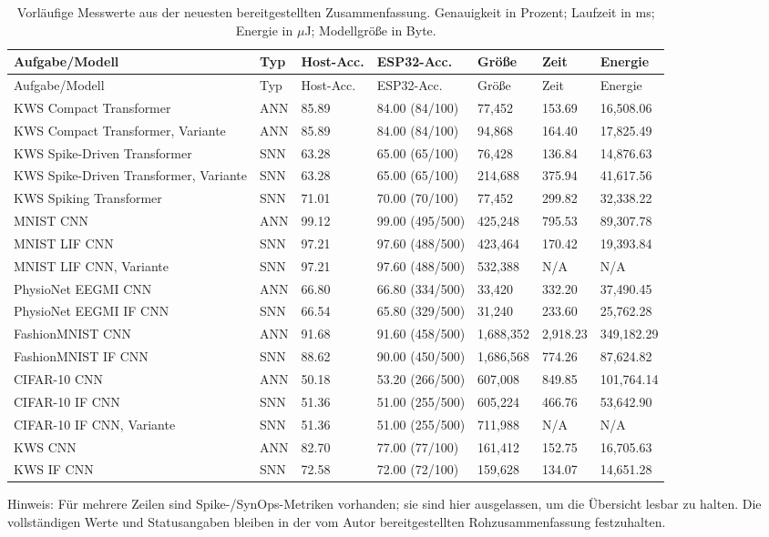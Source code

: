 \documentclass[11pt,a4paper]{article}
\begin{document}
\begin{longtable}{p{2.1cm}p{1.35cm}p{1.35cm}p{1.45cm}p{1.35cm}p{1.1cm}p{1.15cm}}
\caption{Vorläufige Messwerte aus der neuesten bereitgestellten Zusammenfassung. Genauigkeit in Prozent; Laufzeit in ms; Energie in $\mu$J; Modellgröße in Byte.}\label{tab:results}\\
\toprule
Aufgabe/Modell & Typ & Host-Acc. & ESP32-Acc. & Größe & Zeit & Energie\\
\midrule
\endfirsthead
\toprule
Aufgabe/Modell & Typ & Host-Acc. & ESP32-Acc. & Größe & Zeit & Energie\\
\midrule
\endhead
KWS Compact Transformer & ANN & 85.89 & 84.00 (84/100) & 77,452 & 153.69 & 16,508.06\\
KWS Compact Transformer, Variante & ANN & 85.89 & 84.00 (84/100) & 94,868 & 164.40 & 17,825.49\\
KWS Spike-Driven Transformer & SNN & 63.28 & 65.00 (65/100) & 76,428 & 136.84 & 14,876.63\\
KWS Spike-Driven Transformer, Variante & SNN & 63.28 & 65.00 (65/100) & 214,688 & 375.94 & 41,617.56\\
KWS Spiking Transformer & SNN & 71.01 & 70.00 (70/100) & 77,452 & 299.82 & 32,338.22\\
MNIST CNN & ANN & 99.12 & 99.00 (495/500) & 425,248 & 795.53 & 89,307.78\\
MNIST LIF CNN & SNN & 97.21 & 97.60 (488/500) & 423,464 & 170.42 & 19,393.84\\
MNIST LIF CNN, Variante & SNN & 97.21 & 97.60 (488/500) & 532,388 & N/A & N/A\\
PhysioNet EEGMI CNN & ANN & 66.80 & 66.80 (334/500) & 33,420 & 332.20 & 37,490.45\\
PhysioNet EEGMI IF CNN & SNN & 66.54 & 65.80 (329/500) & 31,240 & 233.60 & 25,762.28\\
FashionMNIST CNN & ANN & 91.68 & 91.60 (458/500) & 1,688,352 & 2,918.23 & 349,182.29\\
FashionMNIST IF CNN & SNN & 88.62 & 90.00 (450/500) & 1,686,568 & 774.26 & 87,624.82\\
CIFAR-10 CNN & ANN & 50.18 & 53.20 (266/500) & 607,008 & 849.85 & 101,764.14\\
CIFAR-10 IF CNN & SNN & 51.36 & 51.00 (255/500) & 605,224 & 466.76 & 53,642.90\\
CIFAR-10 IF CNN, Variante & SNN & 51.36 & 51.00 (255/500) & 711,988 & N/A & N/A\\
KWS CNN & ANN & 82.70 & 77.00 (77/100) & 161,412 & 152.75 & 16,705.63\\
KWS IF CNN & SNN & 72.58 & 72.00 (72/100) & 159,628 & 134.07 & 14,651.28\\
\bottomrule
\end{longtable}
\smallskip
\noindent\footnotesize Hinweis: Für mehrere Zeilen sind Spike-/SynOps-Metriken vorhanden; sie sind hier ausgelassen, um die Übersicht lesbar zu halten. Die vollständigen Werte und Statusangaben bleiben in der vom Autor bereitgestellten Rohzusammenfassung festzuhalten.\normalsize
\end{document}
